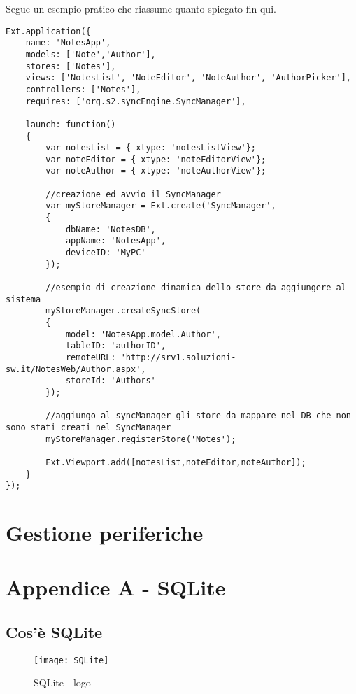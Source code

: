 \documentclass[10pt,a4paper,onecolumn]{article}
\begin{document}
Segue un esempio pratico che riassume quanto spiegato fin qui.

\begin{lstlisting}
Ext.application({
	name: 'NotesApp',
	models: ['Note','Author'],
	stores: ['Notes'],
	views: ['NotesList', 'NoteEditor', 'NoteAuthor', 'AuthorPicker'],
	controllers: ['Notes'],
	requires: ['org.s2.syncEngine.SyncManager'],
	
	launch: function()
	{
		var notesList = { xtype: 'notesListView'};
		var noteEditor = { xtype: 'noteEditorView'};
		var noteAuthor = { xtype: 'noteAuthorView'};
		
		//creazione ed avvio il SyncManager
		var myStoreManager = Ext.create('SyncManager',
		{
			dbName: 'NotesDB',
			appName: 'NotesApp',
			deviceID: 'MyPC'
		});
		
		//esempio di creazione dinamica dello store da aggiungere al sistema
		myStoreManager.createSyncStore(
		{
			model: 'NotesApp.model.Author',
			tableID: 'authorID',
			remoteURL: 'http://srv1.soluzioni-sw.it/NotesWeb/Author.aspx',
			storeId: 'Authors'
		});
		
		//aggiungo al syncManager gli store da mappare nel DB che non sono stati creati nel SyncManager
		myStoreManager.registerStore('Notes');
		
		Ext.Viewport.add([notesList,noteEditor,noteAuthor]);
	}
});
\end{lstlisting}

\clearpage

\section{Gestione periferiche}


\clearpage

\section{Appendice A - SQLite}

\subsection{Cos'è SQLite}

\begin{figure}[h]
	\centering
	\texttt{[image: SQLite]}
	\caption{SQLite - logo}						
	\label{fig:sqllite logo}
\end{figure}
\end{document}
